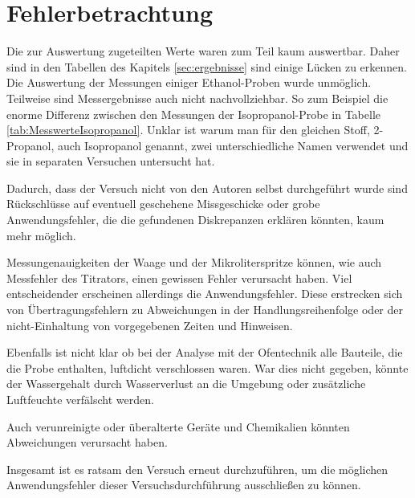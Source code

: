\section{Fehlerbetrachtung}
\label{sec:fehler}

Die zur Auswertung zugeteilten Werte waren zum Teil kaum auswertbar. Daher sind in den Tabellen des Kapitels \ref{sec:ergebnisse} sind einige Lücken zu erkennen. Die Auswertung der Messungen einiger Ethanol-Proben wurde unmöglich. Teilweise sind Messergebnisse auch nicht nachvollziehbar. So zum Beispiel die enorme Differenz zwischen den Messungen der Isopropanol-Probe in Tabelle \ref{tab:MesswerteIsopropanol}. Unklar ist warum man für den gleichen Stoff, 2-Propanol, auch Isopropanol genannt, zwei unterschiedliche Namen verwendet und sie in separaten Versuchen untersucht hat. 

Dadurch, dass der Versuch nicht von den Autoren selbst durchgeführt wurde sind Rückschlüsse auf eventuell geschehene Missgeschicke oder grobe Anwendungsfehler, die die gefundenen Diskrepanzen erklären könnten, kaum mehr möglich. 

Messungenauigkeiten der Waage und der Mikroliterspritze können, wie auch Messfehler des Titrators, einen gewissen Fehler verursacht haben. Viel entscheidender erscheinen allerdings die Anwendungsfehler. Diese erstrecken sich von Übertragungsfehlern zu Abweichungen in der Handlungsreihenfolge oder der nicht-Einhaltung von vorgegebenen Zeiten und Hinweisen.

Ebenfalls ist nicht klar ob bei der Analyse mit der Ofentechnik alle Bauteile, die die Probe enthalten, luftdicht verschlossen waren. War dies nicht gegeben, könnte der Wassergehalt durch Wasserverlust an die Umgebung oder zusätzliche Luftfeuchte verfälscht werden.

Auch verunreinigte oder überalterte Geräte und Chemikalien könnten Abweichungen verursacht haben.

Insgesamt ist es ratsam den Versuch erneut durchzuführen, um die möglichen Anwendungsfehler dieser Versuchsdurchführung ausschließen zu können.